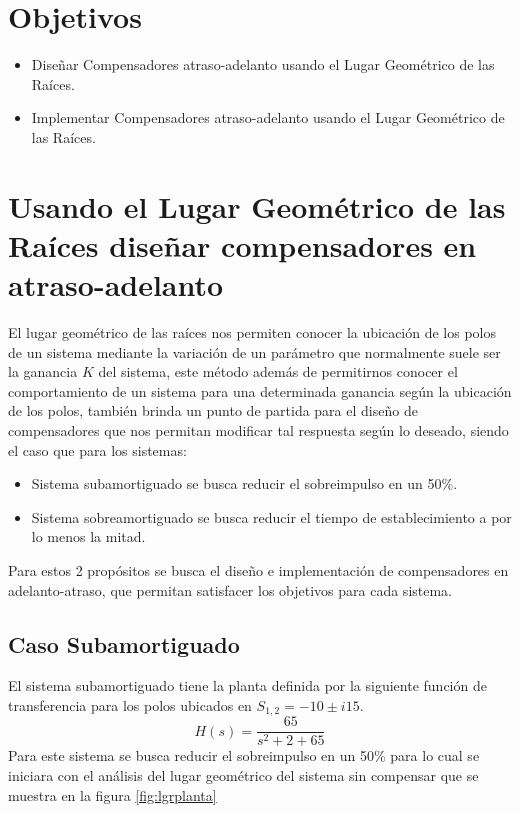 \documentclass[conference]{IEEEtran}
\begin{document}
	\section{Objetivos}
	
	\begin{itemize}
		\item Diseñar Compensadores atraso-adelanto usando el Lugar Geométrico de las Raíces.
		\item Implementar Compensadores atraso-adelanto usando el Lugar Geométrico de las Raíces.
	\end{itemize}
	
	\section{Usando el Lugar Geométrico de las Raíces diseñar compensadores en atraso-adelanto}
	
	El lugar geométrico de las raíces nos permiten conocer la ubicación de los polos de un sistema mediante la variación de un parámetro que normalmente suele ser la ganancia $K$ del sistema, este método además de permitirnos conocer el comportamiento de un sistema para una determinada ganancia según la ubicación de los polos, también brinda un punto de partida para el diseño de compensadores que nos permitan modificar tal respuesta según lo deseado, siendo el caso que para los sistemas:
	
	\begin{itemize}
		\item Sistema subamortiguado se busca reducir el sobreimpulso en un 50\%.
		\item Sistema sobreamortiguado se busca reducir el tiempo de establecimiento a por lo menos la mitad.
	\end{itemize}
	
	Para estos 2 propósitos se busca el diseño e implementación de compensadores en adelanto-atraso, que permitan satisfacer los objetivos para cada sistema.
	
	\subsection{\textbf{Caso Subamortiguado}}
	El sistema subamortiguado tiene la planta definida por la siguiente función de transferencia para los polos ubicados en $S_{1,2} = -10 \pm i15$.
	\begin{equation}
		H(s) = \frac{65}{s^2 + 2 + 65}
		\label{eq:ft-planta}
	\end{equation}
	Para este sistema se busca reducir el sobreimpulso en un 50\% para lo cual se iniciara con el análisis del lugar geométrico del sistema sin compensar que se muestra en la figura \ref{fig:lgrplanta}
	
\end{document}
